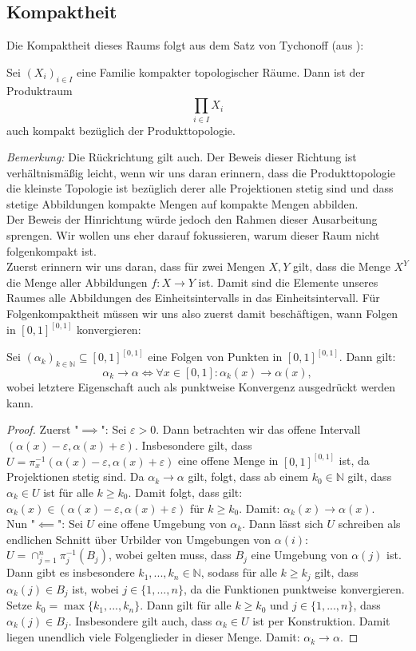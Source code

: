 \documentclass[11pt]{scrartcl}
\newcommand{\N}{\mathbb{N}}
\begin{document}
\subsection{Kompaktheit}
\noindent Die Kompaktheit dieses Raums folgt aus dem Satz von Tychonoff (aus \cite{Top}):
\begin{theorem}
	Sei $(X_i)_{i\in I}$ eine Familie kompakter topologischer Räume. Dann ist der Produktraum 
	$$\prod_{i\in I} X_i$$ auch kompakt bezüglich der Produkttopologie.
\end{theorem}
\textit{Bemerkung:} Die Rückrichtung gilt auch. Der Beweis dieser Richtung ist verhältnismäßig leicht, wenn
wir uns daran erinnern, dass die Produkttopologie die kleinste Topologie ist bezüglich derer alle Projektionen
stetig sind und dass stetige Abbildungen kompakte Mengen auf kompakte Mengen abbilden.\\
Der Beweis der Hinrichtung würde jedoch den Rahmen dieser Ausarbeitung sprengen. Wir wollen uns eher darauf fokussieren,
warum dieser Raum nicht folgenkompakt ist.\\
Zuerst erinnern wir uns daran, dass für zwei Mengen $X,Y$ gilt, dass die Menge $X^Y$ die Menge aller Abbildungen $f:X\rightarrow Y$
ist. Damit sind die Elemente unseres Raumes alle Abbildungen des Einheitsintervalls in das Einheitsintervall. Für Folgenkompaktheit
müssen wir uns also zuerst damit beschäftigen, wann Folgen in $[0,1]^{[0,1]}$ konvergieren:
\begin{theorem}
	Sei $(\alpha_k)_{k\in\mathbb N} \subseteq [0,1]^{[0,1]}$ eine Folgen von Punkten in $[0,1]^{[0,1]}$. Dann gilt:
	$$\alpha_k \rightarrow \alpha \iff \forall x\in[0,1]: \alpha_k(x)\rightarrow \alpha(x),$$
	wobei letztere Eigenschaft auch als punktweise Konvergenz ausgedrückt werden kann.
\end{theorem}
\begin{proof}
	Zuerst "$\implies$": Sei $\varepsilon >0$. Dann betrachten wir das offene Intervall $(\alpha(x)-\varepsilon, \alpha(x)+\varepsilon)$. Insbesondere gilt, 
	dass $U=\pi_{x}^{-1}(\alpha(x)-\varepsilon,\alpha(x)+\varepsilon)$ eine offene Menge in $[0,1]^{[0,1]}$ ist, da Projektionen stetig sind. Da $\alpha_k\rightarrow \alpha$ gilt, folgt, dass 
	ab einem $k_0\in\N$ gilt, dass $\alpha_k\in U$ ist für alle $k\geq k_0$. Damit folgt, dass gilt: $\alpha_k(x)\in (\alpha(x)-\varepsilon, \alpha(x)+\varepsilon)$ für $k \geq k_0$. 
	Damit: $\alpha_k(x)\rightarrow \alpha(x)$.\\
	Nun "$\impliedby$": Sei $U$ eine offene Umgebung von $\alpha_k$. Dann lässt sich $U$ schreiben als endlichen Schnitt über Urbilder von Umgebungen von $\alpha(i)$: $U=\cap_{j=1}^n \pi_j^{-1}(B_j)$, 
	wobei gelten muss, dass $B_j$ eine Umgebung von $\alpha(j)$ ist. Dann gibt es insbesondere $k_1,...,k_n\in\N$, sodass für alle $k \geq k_j$ gilt, dass $\alpha_k(j) \in B_j$ ist, wobei 
	$j\in \{1,...,n\}$, da die Funktionen punktweise konvergieren. Setze $k_0=\max\{k_1,...,k_n\}$. Dann gilt für alle $k\geq k_0$ und $j \in \{1,...,n\}$, dass $\alpha_k(j) \in B_j$. Insbesondere
	gilt auch, dass $\alpha_k \in U$ ist per Konstruktion. Damit liegen unendlich viele Folgenglieder in dieser Menge. Damit: $\alpha_k\rightarrow \alpha$.
\end{proof}
\end{document}
